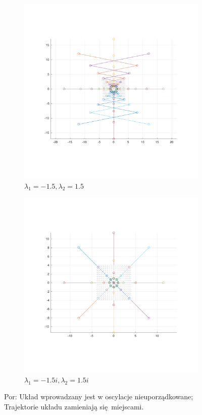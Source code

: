 \documentclass[]{article}
\begin{document}
\begin{figure}[H]
	\centering
	\begin{subfigure}{.5\textwidth}
		\centering
		\includegraphics[width=0.99\linewidth]{imag_osc2}
		\caption{$\lambda_1 = -1.5, \lambda_2 = 1.5$}
		\label{fig:imag_osc}
	\end{subfigure}%
	\begin{subfigure}{.5\textwidth}
		\centering
		\includegraphics[width=0.99\linewidth]{imag_rot}
		\caption{$\lambda_1 = -1.5i, \lambda_2 = 1.5i$}
		\label{fig:imag_rot}
	\end{subfigure}
	\caption{Por: Układ wprowadzany jest w oscylacje nieuporządkowane; Trajektorie układu zamieniają się miejscami.}
	\label{fig5}
\end{figure}
\end{document}
